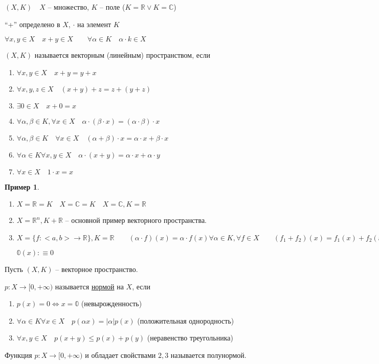 \documentclass{book}
\newcommand\R{\ensuremath{\mathbb{R}}}
\renewcommand\C{\ensuremath{\mathbb{C}}}
\theoremstyle{definition}
\newtheorem*{example}{Пример}
\begin{document}
    \begin{definition}
        $(X,K)\quad X$ -- множество, $K$ -- поле ($K = \R\lor K = \C$)

        ``+'' определено в $X$, $\cdot $ на элемент $K$

        $\forall x, y\in X\quad x+y\in X\qquad \forall \alpha \in K\quad \alpha\cdot k \in X$

        $(X,K)$ называется векторным (линейным) пространством, если
        \begin{enumerate}
            \item $\forall x, y\in X\quad x+y = y+x$
            \item $\forall x, y, z\in X\quad (x+y)+z = z + (y+z)$
            \item $\exists 0\in X\quad x+0=x$
            \item $\forall \alpha, \beta \in K, \forall x\in X\quad \alpha\cdot \left( \beta\cdot x \right)  = (\alpha\cdot \beta)\cdot x$
            \item $\forall \alpha, \beta\in K\quad \forall x\in X\quad (\alpha+\beta)\cdot x = \alpha\cdot x + \beta\cdot x$
            \item $\forall \alpha\in K\forall x, y\in X\quad \alpha\cdot (x+y) = \alpha\cdot x + \alpha\cdot y$
            \item $\forall x\in X\quad 1\cdot x = x$
        \end{enumerate}
    \end{definition}

    \begin{example}
        \begin{enumerate}
            \item $X=\R=K\quad X = \C = K\quad X=\C, K=\R$
            \item $X = \R^n, K+\R$ -- основной пример векторного пространства.
            \item $X = \{f:<a,b> \to \R\}, K = \R\qquad (\alpha\cdot f)(x) = \alpha\cdot f(x) \forall \alpha\in K, \forall f\in X\qquad (f_1+f_2)(x) = f_1(x) + f_2(x)$

                $\mathbb{0}(x):\equiv 0$
        \end{enumerate}
    \end{example}

    \begin{definition}
        Пусть $(X,K)$ -- векторное пространство.

        $p:X \to [0,+\infty )$ называется \underline{нормой} на $X$, если
        \begin{enumerate}
            \item $p(x) = 0 \iff  x = \mathbb{0}$ (невырожденность)
            \item $\forall \alpha\in K\forall x\in X\quad p(\alpha x) = \left| \alpha \right| p(x)$ (положительная однородность)
            \item $\forall x, y\in X\quad p(x+y)\leqslant p(x) + p(y)$ (неравенство треугольника)
        \end{enumerate}
        Функция $p:X\to [0,+\infty )$ и обладает свойствами $2, 3$ называется полунормой.
    \end{definition}
\end{document}
